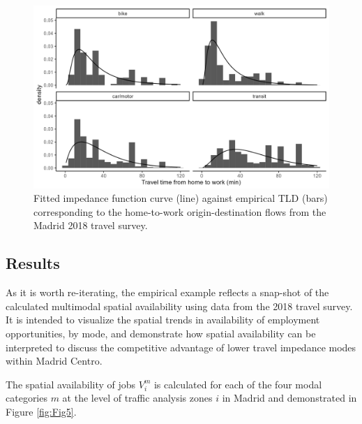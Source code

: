 \documentclass[10pt,letterpaper]{article}
\begin{document}
\begin{figure}

{\centering \includegraphics[width=1\linewidth]{images/tlds_curves_m_plot} 

}

\caption{\label{fig:Fig4} Fitted impedance function curve (line) against empirical TLD (bars) corresponding to the home-to-work origin-destination flows from the Madrid 2018 travel survey.}\label{fig:tlds-curves-m-plot}
\end{figure}

\hypertarget{results}{%
\subsection{Results}\label{results}}

As it is worth re-iterating, the empirical example reflects a snap-shot
of the calculated multimodal spatial availability using data from the
2018 travel survey. It is intended to visualize the spatial trends in
availability of employment opportunities, by mode, and demonstrate how
spatial availability can be interpreted to discuss the competitive
advantage of lower travel impedance modes within Madrid Centro.

The spatial availability of jobs \(V_i^m\) is calculated for each of the
four modal categories \(m\) at the level of traffic analysis zones \(i\)
in Madrid and demonstrated in Figure \ref{fig:Fig5}.
\end{document}
